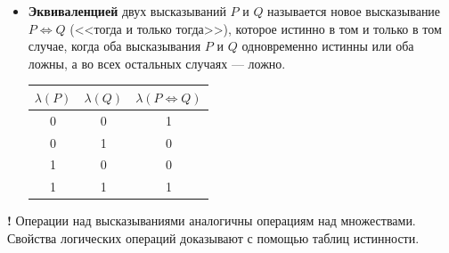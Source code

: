 \documentclass[a4paper, 12pt]{article}
\begin{document}
\begin{itemize}
  \item \textbf{Эквиваленцией} двух высказываний $P$ и $Q$ называется новое
    высказывание $P \Leftrightarrow Q$ (<<тогда и только тогда>>), которое
    истинно в том и только в том случае, когда оба высказывания $P$ и $Q$
    одновременно истинны или оба ложны, а во всех остальных случаях --- ложно.
    \begin{center}
    \begin{tabular}{c|c|c}
      $\lambda(P)$ & $\lambda(Q)$ & $\lambda(P \Leftrightarrow Q)$ \\ \hline
      0 & 0 & 1 \\
      0 & 1 & 0 \\
      1 & 0 & 0 \\
      1 & 1 & 1 \\
    \end{tabular}
    \end{center}
\end{itemize}

\textbf{!} Операции над высказываниями аналогичны операциям над множествами.
Свойства логических операций доказывают с помощью таблиц истинности.
\end{document}
